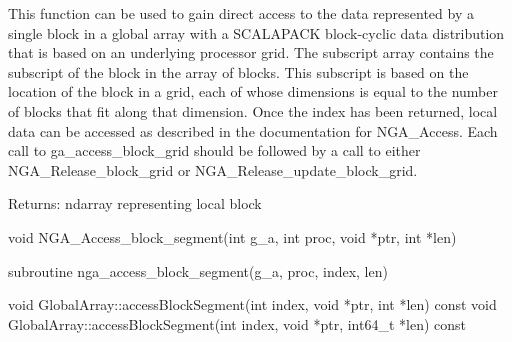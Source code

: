 \documentclass[12pt]{article}
\begin{document}
\local

\begin{desc}

This function can be used to gain direct access to the data represented by a
single block in a global array with a SCALAPACK block-cyclic data distribution
that is based on an underlying processor grid. The subscript array contains the
subscript of the block in the array of blocks. This subscript is based on the
location of the block in a grid, each of whose dimensions is equal to the
number of blocks that fit along that dimension. Once the index has been
returned, local data can be accessed as described in the documentation for
NGA_Access. Each call to ga_access_block_grid should be followed by a call to
either NGA_Release_block_grid or NGA_Release_update_block_grid.

Returns: ndarray representing local block

\end{desc}



\begin{capi}
\begin{ccode}
void NGA_Access_block_segment(int g_a, int proc, void *ptr, int *len)
\end{ccode}
\begin{funcargs}
\end{funcargs}
\end{capi}

\begin{fapi}
\begin{fcode}
subroutine nga_access_block_segment(g_a, proc, index, len)
\end{fcode}
\begin{funcargs}
\end{funcargs}
\end{fapi}

\begin{cxxapi}
\begin{cxxcode}
void GlobalArray::accessBlockSegment(int index, void *ptr,
                                     int *len) const
void GlobalArray::accessBlockSegment(int index, void *ptr,
                                     int64_t *len) const
\end{cxxcode}
\begin{funcargs}
\end{funcargs}
\end{cxxapi}
\end{document}
